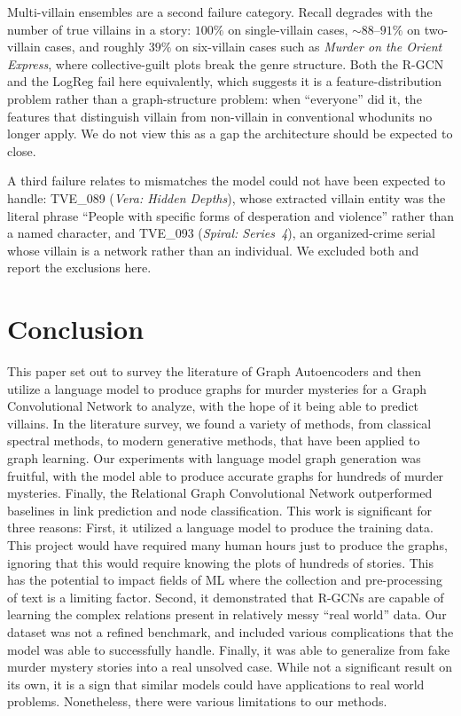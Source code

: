 \documentclass[11pt]{article}
\theoremstyle{definition}
\begin{document}
Multi-villain ensembles are a second failure category. Recall degrades with the number of true villains in a story: $100\%$ on single-villain cases, $\sim\!88$--$91\%$ on two-villain cases, and roughly $39\%$ on six-villain cases such as \emph{Murder on the Orient Express}, where collective-guilt plots break the genre structure. Both the R-GCN and the LogReg fail here equivalently, which suggests it is a feature-distribution problem rather than a graph-structure problem: when ``everyone'' did it, the features that distinguish villain from non-villain in conventional whodunits no longer apply. We do not view this as a gap the architecture should be expected to close.

A third failure relates to mismatches the model could not have been expected to handle: TVE\_089 (\emph{Vera: Hidden Depths}), whose extracted villain entity was the literal phrase ``People with specific forms of desperation and violence'' rather than a named character, and TVE\_093 (\emph{Spiral: Series~4}), an organized-crime serial whose villain is a network rather than an individual. We excluded both and report the exclusions here.

\section{Conclusion}
This paper set out to survey the literature of Graph Autoencoders and then utilize a language
model to produce graphs for murder mysteries for a Graph Convolutional Network to analyze, with
the hope of it being able to predict villains.
In the literature survey, we found a variety of methods, from classical spectral methods, to
modern generative methods, that have been applied to graph learning. Our experiments with
language model graph generation was fruitful, with the model able to produce accurate graphs for
hundreds of murder mysteries. Finally, the Relational Graph Convolutional Network outperformed
baselines in link prediction and node classification.
This work is significant for three reasons:
First, it utilized a language model to produce the training data. This project would have
required many human hours just to produce the graphs, ignoring that this would require knowing
the plots of hundreds of stories. This has the potential to impact fields of ML where the collection and pre-processing of text is a limiting factor.
Second, it demonstrated that R-GCNs are capable of learning the complex relations present in
relatively messy ``real world” data. Our dataset was not a refined benchmark, and included various
complications that the model was able to successfully handle.
Finally, it was able to generalize from fake murder mystery stories into a real unsolved case.
While not a significant result on its own, it is a sign that similar models could have applications to
real world problems.
Nonetheless, there were various limitations to our methods.
\end{document}
